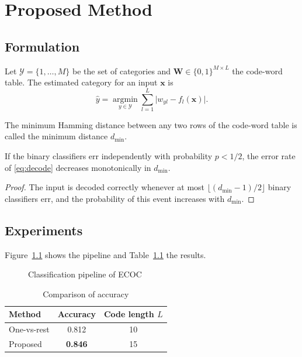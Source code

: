 \chapter{Proposed Method}\label{chap:method}

\section{Formulation}

Let $\mathcal{Y} = \{1, \dots, M\}$ be the set of categories and
$\bm{W} \in \{0,1\}^{M \times L}$ the code-word table. The estimated
category for an input $\bm{x}$ is
\begin{equation}
  \hat{y} = \operatorname*{argmin}_{y \in \mathcal{Y}} \sum_{l=1}^{L} \bigl| w_{yl} - f_l(\bm{x}) \bigr|.
  \label{eq:decode}
\end{equation}

\begin{definition}
The minimum Hamming distance between any two rows of the code-word table is
called the minimum distance $d_{\min}$.
\end{definition}

\begin{theorem}\label{thm:bound}
If the binary classifiers err independently with probability $p < 1/2$,
the error rate of \eqref{eq:decode} decreases monotonically in $d_{\min}$.
\end{theorem}

\begin{proof}
The input is decoded correctly whenever at most
$\lfloor (d_{\min}-1)/2 \rfloor$ binary classifiers err, and the
probability of this event increases with $d_{\min}$.
\end{proof}

\section{Experiments}

Figure~\ref{fig:pipeline} shows the pipeline and Table~\ref{tab:result}
the results.

\begin{figure}[tb]
  \centering
  \caption{Classification pipeline of ECOC}\label{fig:pipeline}
\end{figure}

\begin{table}[tb]
  \centering
  \caption{Comparison of accuracy}\label{tab:result}
  \begin{tabular}{lcc}
    \toprule
    Method & Accuracy & Code length $L$ \\
    \midrule
    One-vs-rest & 0.812 & 10 \\
    Proposed    & \textbf{0.846} & 15 \\
    \bottomrule
  \end{tabular}
\end{table}
